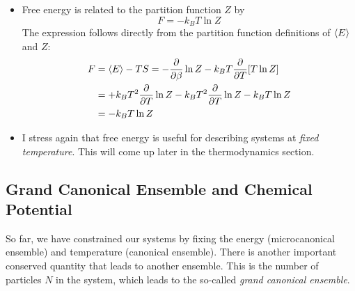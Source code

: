 \documentclass[11pt, a4paper]{article}
\begin{document}
\begin{itemize}
	\item Free energy is related to the partition function $ Z $ by
	\begin{equation*}
		F = - k_{B} T \ln Z
	\end{equation*}
	The expression follows directly from the partition function definitions of $ \expval{E} $ and $ Z $:
	\begin{align*}
		F &= \expval{E} - TS = - \pdv{}{\beta} \ln Z - k_{B} T \pdv{}{T}[T \ln Z]\\
		&= + k_{B}T^{2}\pdv{}{T} \ln Z - k_{B}T^{2} \pdv{}{T} \ln Z - k_{B}T \ln Z\\
		&=- k_{B}T \ln Z
	\end{align*}
	
	\item I stress again that free energy is useful for describing systems at \textit{fixed temperature}. This will come up later in the thermodynamics section.
	
\end{itemize}



\subsection{Grand Canonical Ensemble and Chemical Potential}
So far, we have constrained our systems by fixing the energy (microcanonical ensemble) and temperature (canonical ensemble). There is another important conserved quantity that leads to another ensemble. This is the number of particles $ N $ in the system, which leads to the so-called \textit{grand canonical ensemble}.
\end{document}
